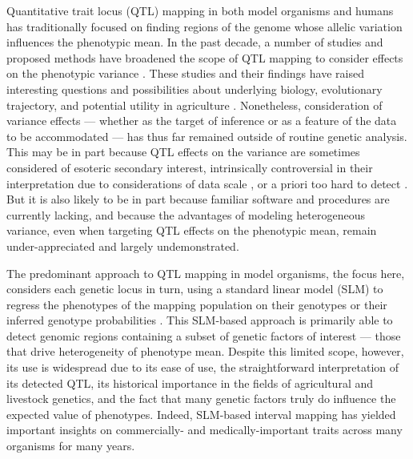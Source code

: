 Quantitative trait locus (QTL) mapping in both model organisms and humans has traditionally focused on finding regions of the genome whose allelic variation influences the phenotypic mean.
In the past decade, a number of studies and proposed methods have broadened the scope of QTL mapping to consider effects on the phenotypic variance \citep{Pare2010,Ronnegard2011a,Hulse2013}. 
These studies and their findings have raised interesting questions and possibilities about underlying biology, evolutionary trajectory, and potential utility in agriculture \citep{Wagner1997,Dworkin2005,Mulder2015}.
Nonetheless, consideration of variance effects --- whether as the target of inference or as a feature of the data to be accommodated ---
has thus far remained outside of routine genetic analysis.
This may be in part because QTL effects on the variance are sometimes considered of esoteric secondary interest, intrinsically controversial in their interpretation due to considerations of data scale \citep{Sun2013a,Shen2013}, or a priori too hard to detect \citep{Visscher2010a}.
But it is also likely to be in part because familiar software and procedures are currently lacking, and because the advantages of modeling heterogeneous variance, even when targeting QTL effects on the phenotypic mean, remain under-appreciated and largely undemonstrated.

The predominant approach to QTL mapping in model organisms, the focus here, considers each genetic locus in turn, using a standard linear model (SLM) to regress the phenotypes of the mapping population on their genotypes or their inferred genotype probabilities \citep{Lander1989a,Haley1992}.
This SLM-based approach is primarily able to detect genomic regions containing a subset of genetic factors of interest --- those that drive heterogeneity of phenotype mean.
Despite this limited scope, however, its use is widespread due to its ease of use, the straightforward interpretation of its detected QTL, its historical importance in the fields of agricultural and livestock genetics, and the fact that many genetic factors truly do influence the expected value of phenotypes.
Indeed, SLM-based interval mapping has yielded important insights on commercially- and medically-important traits across many organisms for many years.


